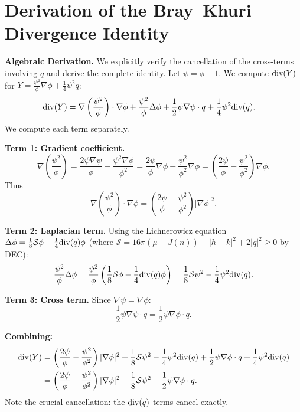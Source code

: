 \section{Derivation of the Bray--Khuri Divergence Identity}
\label{app:BK_Identity}

\textbf{Algebraic Derivation.}
We explicitly verify the cancellation of the cross-terms involving $q$ and derive the complete identity.
Let $\psi = \phi-1$. We compute $\mathrm{div}(Y)$ for $Y = \frac{\psi^2}{\phi}\nabla \phi + \frac{1}{4}\psi^2 q$:
\begin{align*}
    \mathrm{div}(Y) &= \nabla\left(\frac{\psi^2}{\phi}\right)\cdot\nabla\phi + \frac{\psi^2}{\phi}\Delta\phi + \frac{1}{2}\psi \nabla\psi\cdot q + \frac{1}{4}\psi^2\mathrm{div}(q).
\end{align*}
We compute each term separately.

\textbf{Term 1: Gradient coefficient.}
\[
    \nabla\left(\frac{\psi^2}{\phi}\right) = \frac{2\psi\nabla\psi}{\phi} - \frac{\psi^2\nabla\phi}{\phi^2} = \frac{2\psi}{\phi}\nabla\phi - \frac{\psi^2}{\phi^2}\nabla\phi = \left(\frac{2\psi}{\phi} - \frac{\psi^2}{\phi^2}\right)\nabla\phi.
\]
Thus
\[
    \nabla\left(\frac{\psi^2}{\phi}\right)\cdot\nabla\phi = \left(\frac{2\psi}{\phi} - \frac{\psi^2}{\phi^2}\right)|\nabla\phi|^2.
\]

\textbf{Term 2: Laplacian term.}
Using the Lichnerowicz equation $\Delta\phi = \frac{1}{8}\mathcal{S}\phi - \frac{1}{4}\mathrm{div}(q)\phi$ (where $\mathcal{S} = 16\pi(\mu - J(n)) + |h-k|^2 + 2|q|^2 \ge 0$ by DEC):
\[
    \frac{\psi^2}{\phi}\Delta\phi = \frac{\psi^2}{\phi}\left(\frac{1}{8}\mathcal{S}\phi - \frac{1}{4}\mathrm{div}(q)\phi\right) = \frac{1}{8}\mathcal{S}\psi^2 - \frac{1}{4}\psi^2\mathrm{div}(q).
\]

\textbf{Term 3: Cross term.}
Since $\nabla\psi = \nabla\phi$:
\[
    \frac{1}{2}\psi\nabla\psi\cdot q = \frac{1}{2}\psi\nabla\phi\cdot q.
\]

\textbf{Combining:}
\begin{align*}
    \mathrm{div}(Y) &= \left(\frac{2\psi}{\phi} - \frac{\psi^2}{\phi^2}\right)|\nabla\phi|^2 + \frac{1}{8}\mathcal{S}\psi^2 - \frac{1}{4}\psi^2\mathrm{div}(q) + \frac{1}{2}\psi\nabla\phi\cdot q + \frac{1}{4}\psi^2\mathrm{div}(q) \\
    &= \left(\frac{2\psi}{\phi} - \frac{\psi^2}{\phi^2}\right)|\nabla\phi|^2 + \frac{1}{8}\mathcal{S}\psi^2 + \frac{1}{2}\psi\nabla\phi\cdot q.
\end{align*}
Note the crucial cancellation: the $\mathrm{div}(q)$ terms cancel exactly.

